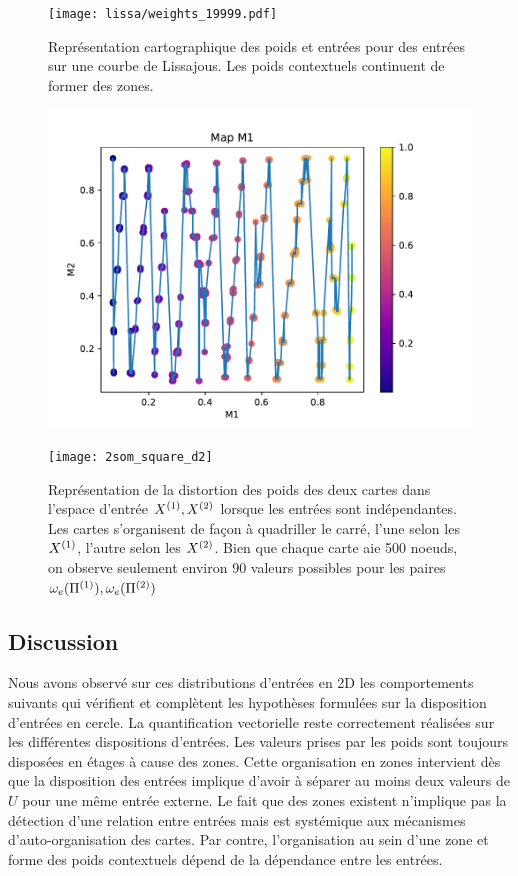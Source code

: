 \documentclass[../main]{subfiles}
\begin{document}
\begin{figure}
	\centering\texttt{[image: lissa/weights\_19999.pdf]}
	\caption{Représentation cartographique des poids et entrées pour des entrées sur une courbe de Lissajous. Les poids contextuels continuent de former des zones.}
\end{figure}

\begin{figure}
	\begin{minipage}{0.48\textwidth}
		\includegraphics[width=\textwidth]{2som_square_d}
	\end{minipage}
	\begin{minipage}{0.48\textwidth}
		\texttt{[image: 2som\_square\_d2]}
	\end{minipage}
	\caption{Représentation de la distortion des poids des deux cartes dans l'espace d'entrée $X^{({1})}, X^{({2})}$ lorsque les entrées sont indépendantes. Les cartes s'organisent de façon à quadriller le carré, l'une selon les $X^{({1})}$, l'autre selon les $X^{({2})}$. Bien que chaque carte aie 500 noeuds, on observe seulement environ 90 valeurs possibles pour les paires $\omega_e(\Pi^{({1})}),\omega_e(\Pi^{({2})})$ \label{2som_p_d}}
\end{figure}



\subsection{Discussion}

Nous avons observé sur ces distributions d'entrées en 2D les comportements suivants qui vérifient et complètent les hypothèses formulées sur la disposition d'entrées en cercle.
La quantification vectorielle reste correctement réalisées sur les différentes dispositions d'entrées. Les valeurs prises par les poids sont toujours disposées en étages à cause des zones.
Cette organisation en zones intervient dès que la disposition des entrées implique d'avoir à séparer au moins deux valeurs de $U$ pour une même entrée externe. Le fait que des zones existent n'implique pas la détection d'une relation entre entrées mais est systémique aux mécanismes d'auto-organisation des cartes. Par contre, l'organisation au sein d'une zone et forme des poids contextuels dépend de la dépendance entre les entrées.
\end{document}
